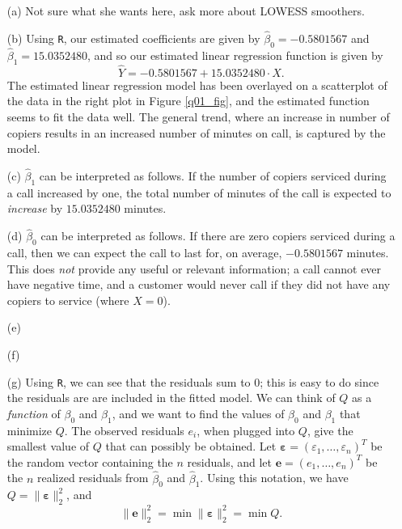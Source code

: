 \documentclass[10pt]{article}
\begin{document}
\begin{itemize}
    \item[(a)] Not sure what she wants here, ask more about LOWESS smoothers.
    \item[(b)] Using \texttt{R}, our estimated coefficients are given by \(\hat{\beta}_0 = -0.5801567\)
    and \(\hat{\beta}_1 = 15.0352480\), and so our estimated linear regression function is given by
    \[\hat{Y} = -0.5801567 + 15.0352480 \cdot X.\] The estimated linear regression model has been 
    overlayed on a scatterplot of the data in the right plot in Figure \ref{q01_fig}, and the 
    estimated function seems to fit the data well. The general trend, where an increase in number of 
    copiers results in an increased number of minutes on call, is captured by the model.
    \item[(c)] \(\hat{\beta}_1\) can be interpreted as follows. If the number of copiers serviced during
    a call increased by one, the total number of minutes of the call is expected to \textit{increase} by 
    \(15.0352480\) minutes. 
    \item[(d)] \(\hat{\beta}_0\) can be interpreted as follows. If there are zero copiers serviced during 
    a call, then we can expect the call to last for, on average, \(-0.5801567 \) minutes. This does \textit{not}
    provide any useful or relevant information; a call cannot ever have negative time, and a customer would never
    call if they did not have any copiers to service (where \(X = 0\)).
    \item[(e)] 
    \item[(f)] 
    \item[(g)] Using \texttt{R}, we can see that the residuals sum to 0; this is easy to do since the residuals are
    are included in the fitted model. We can think of \(Q\) as a \textit{function} 
    of \(\beta_0\) and \(\beta_1\), and we want to find the values of \(\beta_0\) and \(\beta_1\) that minimize \(Q\).
    The observed residuals \(e_i\), when plugged into \(Q\), give the smallest value of \(Q\) that can possibly be obtained. 
    Let \(\bm{\varepsilon} = (\varepsilon_1, \ldots, \varepsilon_n)^T\) be the random vector containing the \(n\) 
    residuals, and let \(\mathbf{e} = (e_1, \ldots, e_n)^T\) be the \(n\) realized residuals from \(\hat{\beta}_0\)
    and \(\hat{\beta}_1\). Using this 
    notation, we have \(Q = \| \bm{\varepsilon} \|_2^2\), and \[\| \mathbf{e}\|_2^2 = \min \|\bm{\varepsilon}\|_2^2 = \min Q.\]

\end{itemize}
\end{document}
